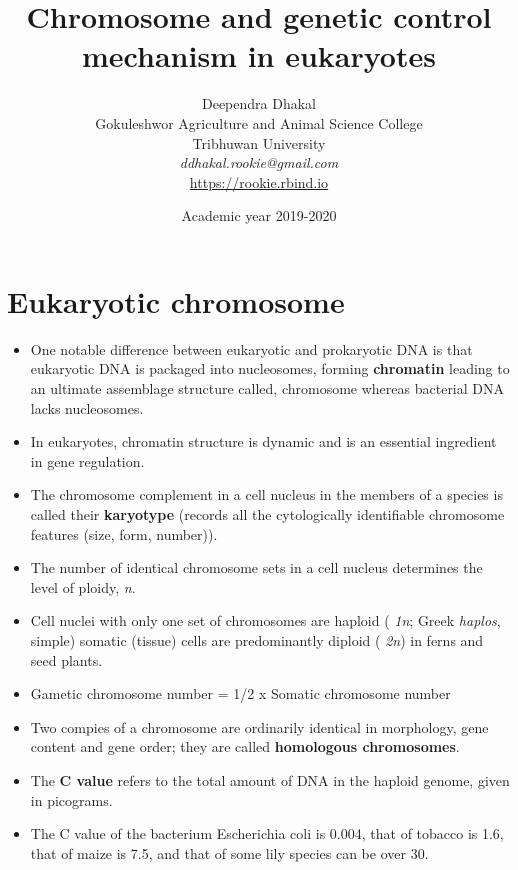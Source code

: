 \documentclass[11pt,dvipsnames,ignorenonframetext,aspectratio=169]{beamer}
\title[]{Chromosome and genetic control mechanism in eukaryotes}
\author[
        Deependra Dhakal\\
Gokuleshwor Agriculture and Animal Science College\\
Tribhuwan University\\
\textit{ddhakal.rookie@gmail.com}\\
\url{https://rookie.rbind.io}
    ]{Deependra Dhakal\\
Gokuleshwor Agriculture and Animal Science College\\
Tribhuwan University\\
\textit{ddhakal.rookie@gmail.com}\\
\url{https://rookie.rbind.io}}
\date[
      Academic year 2019-2020
  ]{
      Academic year 2019-2020
        }
\providecommand{\tightlist}{%
  \setlength{\itemsep}{0pt}\setlength{\parskip}{0pt}}
\begin{document}
  \begin{frame}[plain]
  \titlepage
  \end{frame}



\hypertarget{eukaryotic-chromosome}{%
\section{Eukaryotic chromosome}\label{eukaryotic-chromosome}}

\begin{frame}{}
\protect\hypertarget{section}{}

\begin{itemize}
\tightlist
\item
  One notable difference between eukaryotic and prokaryotic DNA is that
  eukaryotic DNA is packaged into nucleosomes, forming
  \textbf{chromatin} leading to an ultimate assemblage structure called,
  chromosome whereas bacterial DNA lacks nucleosomes.
\item
  In eukaryotes, chromatin structure is dynamic and is an essential
  ingredient in gene regulation.
\item
  The chromosome complement in a cell nucleus in the members of a
  species is called their \textbf{karyotype} (records all the
  cytologically identifiable chromosome features (size, form, number)).
\end{itemize}

\end{frame}

\begin{frame}{}
\protect\hypertarget{section-1}{}

\begin{itemize}
\tightlist
\item
  The number of identical chromosome sets in a cell nucleus determines
  the level of ploidy, \emph{n}.
\item
  Cell nuclei with only one set of chromosomes are haploid ( \emph{1n};
  Greek \emph{haplos}, simple) somatic (tissue) cells are predominantly
  diploid ( \emph{2n}) in ferns and seed plants.
\item
  Gametic chromosome number = 1/2 x Somatic chromosome number
\item
  Two compies of a chromosome are ordinarily identical in morphology,
  gene content and gene order; they are called \textbf{homologous
  chromosomes}.
\item
  The \textbf{C value} refers to the total amount of DNA in the haploid
  genome, given in picograms.
\item
  The C value of the bacterium Escherichia coli is 0.004, that of
  tobacco is 1.6, that of maize is 7.5, and that of some lily species
  can be over 30.
\end{itemize}

\end{frame}
\end{document}
